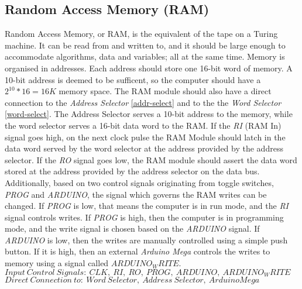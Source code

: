 \subsection{Random Access Memory (RAM)} \label{ram}
Random Access Memory, or RAM, is the equivalent of the tape on a Turing machine. It can be read from and written to, and it should
be large enough to accommodate algorithms, data and variables; all at the same time. Memory is organised in addresses. Each address
should store one 16-bit word of memory. A 10-bit address is deemed to be sufficent, so the computer should have a
\(2^{10}*16 = 16K\) memory space. The RAM module should also have a direct connection to the \emph{Address Selector}
\ref{addr-select} and to the the \emph{Word Selector} \ref{word-select}. The Address Selector serves a 10-bit address to the
memory, while the word selector serves a 16-bit data word to the RAM. If the \emph{RI} (RAM In) signal goes high, on the next clock
pulse the RAM Module should latch in the data word served by the word selector at the address provided by the address
selector. If the \emph{RO} signal goes low, the RAM module should assert the data word stored at the address provided by the
address selector on the data bus. Additionally, based on two control signals originating from toggle switches, \emph{PROG} and
\emph{ARDUINO}, the signal which governs the RAM writes can be changed. If \emph{PROG} is low, that means the computer is in run
mode, and the \emph{RI} signal controls writes. If \emph{PROG} is high, then the computer is in programming mode, and the
write signal is chosen based on the \emph{ARDUINO} signal. If \emph{ARDUINO} is low, then the writes are manually controlled
using a simple push button. If it is high, then an external \emph{Arduino Mega} \cite{arduino2020mega} controls the writes to
memory using a signal called \emph{$ARDUINO_WRITE$}. \\
\textbf{$Input\:Control\:Signals:\:CLK,\:RI,\:RO,\:PROG,\:ARDUINO,\:ARDUINO_WRITE$} \\
\textbf{$Direct\:Connection\:to:\:Word\:Selector,\:Address\:Selector,\:Arduino Mega$}


